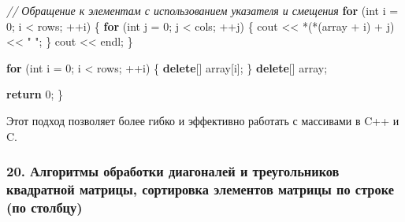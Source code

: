 \documentclass[
]{article}
\newenvironment{Shaded}{}{}
\newcommand{\CommentTok}[1]{\textcolor[rgb]{0.38,0.63,0.69}{\textit{#1}}}
\newcommand{\ControlFlowTok}[1]{\textcolor[rgb]{0.00,0.44,0.13}{\textbf{#1}}}
\newcommand{\DataTypeTok}[1]{\textcolor[rgb]{0.56,0.13,0.00}{#1}}
\newcommand{\DecValTok}[1]{\textcolor[rgb]{0.25,0.63,0.44}{#1}}
\newcommand{\KeywordTok}[1]{\textcolor[rgb]{0.00,0.44,0.13}{\textbf{#1}}}
\newcommand{\NormalTok}[1]{#1}
\newcommand{\OperatorTok}[1]{\textcolor[rgb]{0.40,0.40,0.40}{#1}}
\newcommand{\StringTok}[1]{\textcolor[rgb]{0.25,0.44,0.63}{#1}}
\begin{document}
\begin{Shaded}
\begin{Highlighting}[]
    \CommentTok{// Обращение к элементам с использованием указателя и смещения}
    \ControlFlowTok{for} \OperatorTok{(}\DataTypeTok{int}\NormalTok{ i }\OperatorTok{=} \DecValTok{0}\OperatorTok{;}\NormalTok{ i }\OperatorTok{\textless{}}\NormalTok{ rows}\OperatorTok{;} \OperatorTok{++}\NormalTok{i}\OperatorTok{)} \OperatorTok{\{}
        \ControlFlowTok{for} \OperatorTok{(}\DataTypeTok{int}\NormalTok{ j }\OperatorTok{=} \DecValTok{0}\OperatorTok{;}\NormalTok{ j }\OperatorTok{\textless{}}\NormalTok{ cols}\OperatorTok{;} \OperatorTok{++}\NormalTok{j}\OperatorTok{)} \OperatorTok{\{}
\NormalTok{            cout }\OperatorTok{\textless{}\textless{}} \OperatorTok{*(*(}\NormalTok{array }\OperatorTok{+}\NormalTok{ i}\OperatorTok{)} \OperatorTok{+}\NormalTok{ j}\OperatorTok{)} \OperatorTok{\textless{}\textless{}} \StringTok{" "}\OperatorTok{;}
        \OperatorTok{\}}
\NormalTok{        cout }\OperatorTok{\textless{}\textless{}}\NormalTok{ endl}\OperatorTok{;}
    \OperatorTok{\}}

    \ControlFlowTok{for} \OperatorTok{(}\DataTypeTok{int}\NormalTok{ i }\OperatorTok{=} \DecValTok{0}\OperatorTok{;}\NormalTok{ i }\OperatorTok{\textless{}}\NormalTok{ rows}\OperatorTok{;} \OperatorTok{++}\NormalTok{i}\OperatorTok{)} \OperatorTok{\{}
        \KeywordTok{delete}\OperatorTok{[]}\NormalTok{ array}\OperatorTok{[}\NormalTok{i}\OperatorTok{];}
    \OperatorTok{\}}
    \KeywordTok{delete}\OperatorTok{[]}\NormalTok{ array}\OperatorTok{;}

    \ControlFlowTok{return} \DecValTok{0}\OperatorTok{;}
\OperatorTok{\}}
\end{Highlighting}
\end{Shaded}

Этот подход позволяет более гибко и эффективно работать с массивами в
C++ и C.

\subsubsection{20. Алгоритмы обработки диагоналей и треугольников
квадратной матрицы, сортировка элементов матрицы по строке (по
столбцу)}\label{ux430ux43bux433ux43eux440ux438ux442ux43cux44b-ux43eux431ux440ux430ux431ux43eux442ux43aux438-ux434ux438ux430ux433ux43eux43dux430ux43bux435ux439-ux438-ux442ux440ux435ux443ux433ux43eux43bux44cux43dux438ux43aux43eux432-ux43aux432ux430ux434ux440ux430ux442ux43dux43eux439-ux43cux430ux442ux440ux438ux446ux44b-ux441ux43eux440ux442ux438ux440ux43eux432ux43aux430-ux44dux43bux435ux43cux435ux43dux442ux43eux432-ux43cux430ux442ux440ux438ux446ux44b-ux43fux43e-ux441ux442ux440ux43eux43aux435-ux43fux43e-ux441ux442ux43eux43bux431ux446ux443}
\end{document}

